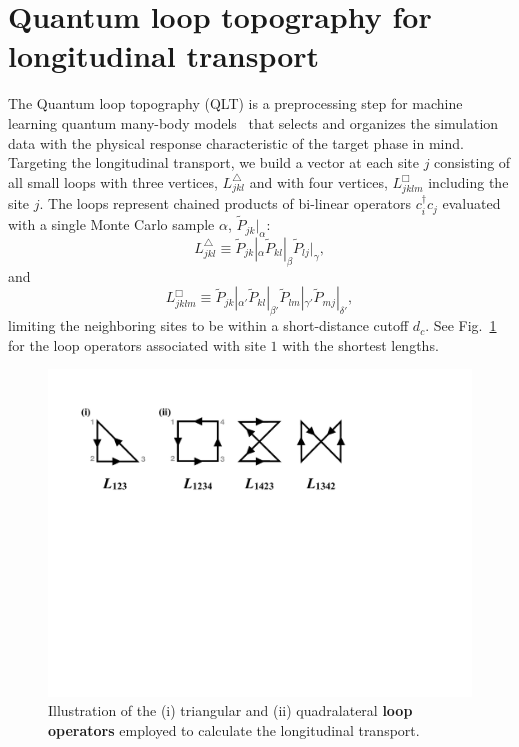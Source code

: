 \documentclass[amsmath,amssymb, aps, prl, twocolumn]{revtex4-1}
\begin{document}
\section{Quantum loop topography for longitudinal transport}
The Quantum loop topography (QLT) is a preprocessing step for machine learning quantum many-body models~\cite{qlt2016} that selects and organizes the simulation data with the physical response characteristic of the target phase in mind. Targeting the longitudinal transport,  we build a vector at each site $j$ consisting of all small loops with three vertices, $L^\triangle_{jkl}$ and with four vertices, $L^\Box_{jklm}$ including the site $j$. The loops represent
chained products of bi-linear operators  $c_i^\dagger c_j$ evaluated with a single Monte Carlo sample $\alpha$, $\widetilde{P}_{jk}|_{\alpha}$:
\begin{equation}
    L^\triangle_{jkl}\equiv\widetilde{P}_{jk}|_{\alpha} \widetilde{P}_{kl}|_{\beta} \widetilde{P}_{lj}|_{\gamma},
    \label{eq:triangle}
\end{equation}
and 
\begin{equation}
L^\Box_{jklm}\equiv\widetilde{P}_{jk}|_{\alpha'} \widetilde{P}_{kl}|_{\beta'} \widetilde{P}_{lm}|_{\gamma'} \widetilde{P}_{mj}|_{\delta'},
\label{eq:quad}
\end{equation}
limiting the neighboring sites to be within a short-distance cutoff $d_c$. See Fig.~\ref{fig:loops} for the loop operators associated with site $1$ with the shortest lengths.

\begin{figure}
\includegraphics[scale=0.48]{LoopOperators.pdf}
\caption{
 Illustration of the (i) triangular and (ii) quadralateral {\bf loop operators} employed to calculate the longitudinal transport. 
}\label{fig:loops}
\end{figure}
\end{document}
